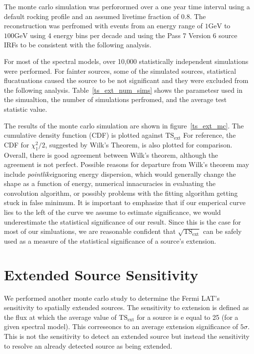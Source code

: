 \documentclass[preprint]{aastex}
\newcommand{\gev}{\text{GeV}}
\newcommand{\tsext}{\ensuremath{\text{TS}_\text{ext}}}
\newcommand{\pointlike}{{\em pointlike}}
\begin{document}
The monte carlo simulation was perforormed over a one year time interval using
a default rocking profile and an assumed livetime fraction of 0.8.
The reconstruction was perfromed with events from an energy range of
$1\gev$ to $100\gev$ using 4 energy bins per decade and using the Pass 7 Version 6
source IRFs to be consistent with the following analysis.

For most of the spectral models, over 10,000 statistically independent simulations were performed.
For fainter sources, some of the simulated sources, statistical flucatuations
caused the source to be not significant and they were excluded from the following analysis.
Table~\ref{ts_ext_num_sims} shows the parametesr used in the simualtion,
the number of simulations perfromed, and the average test statistic value.


The results of the monte carlo simulation are shown in
figure~\ref{ts_ext_mc}.  The cumulative density function (CDF) is plotted
against $\tsext$ For reference, the CDF for $\chi^2_1/2$,
suggested by Wilk's Theorem, is also plotted for comparison. Overall,
there is good agreement between Wilk's theorem, although the agreement
is not perfect.  Possible reasons for departure from Wilk's theorem may
include \pointlike ignoring energy dispersion, which would generally change
the shape as a function of energy, numerical innacuracies in evaluating
the convolution algorithm, or possibly problems with the fitting algorithm
getting stuck in false minimum. It is important to emphasize that if
our emperical curve lies to the left of the curve we assume to estimate
significance, we would underestimate the statistical significance of
our result. Since this is the case for most of our simluations, we are
reasonable confident that $\sqrt{\tsext}$ can be safely
used as a measure of the statistical significance of a source's extension.

\section{Extended Source Sensitivity}

We performed another monte carlo study to determine the Fermi LAT's
sensitivity to spatially extended sources. The sensitivity to extension
is defined as the flux at which 
the average value of $\tsext$ for a source is 
e equal to 25 (for a given spectral model). This correseoncs
to an average extension significance of $5\sigma$.  This is not the
sensitivity to detect an extended source but instead the sensitivity to
resolve an already detected source as being extended.  
\end{document}
